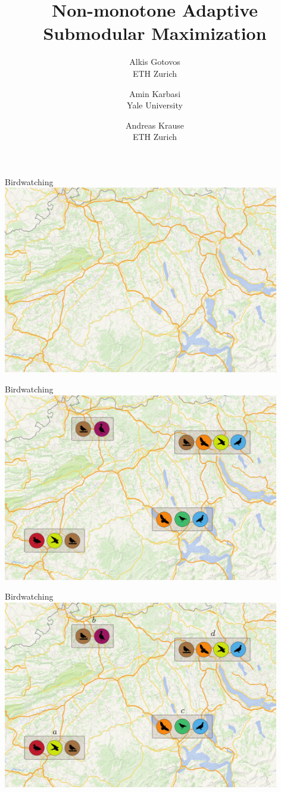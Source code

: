\documentclass[xetex,10pt,mathserif]{beamer}
\title[Non-monotone Adaptive Submodular Maximization]
{Non-monotone Adaptive Submodular Maximization}
\author[Alkis Gotovos]{
\vspace{1in}
\normalsize
\parbox{1in}{Alkis Gotovos\\{\footnotesize ETH Zurich}}\and
\parbox{1in}{Amin Karbasi\\{\footnotesize Yale University}}\and
\parbox{1in}{Andreas Krause\\{\footnotesize ETH Zurich}}
}
\date[May 4, 2015]{
\begin{center}
{\normalsize
ICML '15
}
\end{center}
}
\begin{document}


\begin{frame}{Birdwatching}
\centering
\includegraphics[width=4.75in]{figures/map.pdf}
\end{frame}

\begin{frame}{Birdwatching}
\centering
\includegraphics[width=4.75in]{figures/intro_1.pdf}
\end{frame}

\begin{frame}{Birdwatching}
\centering
\includegraphics[width=4.75in]{figures/intro_2.pdf}
\end{frame}
\end{document}
